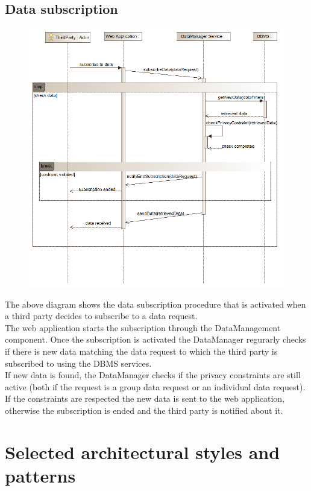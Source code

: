 \subsection{Data subscription}
\begin{figure}[H]
\centering
\includegraphics[width=\linewidth]{resources/uml/sequence/DataSubscription.png}
\end{figure}
The above diagram shows the data subscription procedure that is activated when a third party decides to subscribe to a data request.\\
The web application starts the subscription through the DataManagement component. Once the subscription is activated the DataManager regurarly checks if there is new data matching the data request to which the third party is subscribed to using the DBMS services.\\
If new data is found, the DataManager checks if the privacy constraints are still active (both if the request is a group data request or an individual data request).\\
If the constraints are respected the new data is sent to the web application, otherwise the subscription is ended and the third party is notified about it.


\section{Selected architectural styles and patterns}
